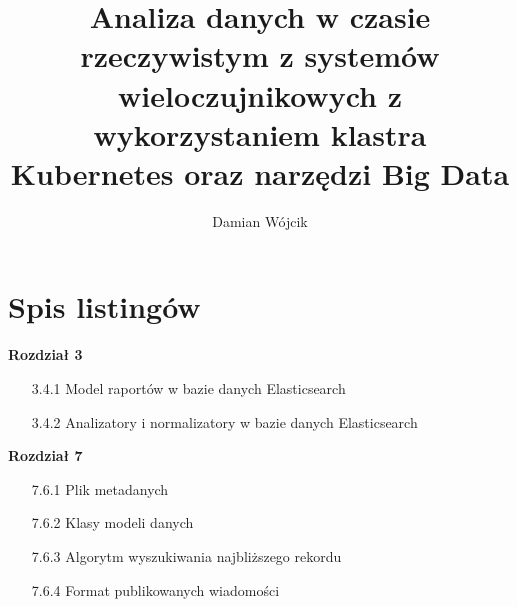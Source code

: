 \documentclass[12pt]{przejsciowka}
\title{Analiza danych w czasie rzeczywistym z systemów wieloczujnikowych z wykorzystaniem klastra Kubernetes oraz narzędzi Big Data}
\author{Damian Wójcik}
\newcommand{\inputcleanchapter}[1]{%
    \begingroup
    
    \endgroup
}
\begin{document}
    \maketitle
    \tableofcontents
    \clearpage

    \inputcleanchapter{abstract_pl}
    \clearpage

    \inputcleanchapter{abstract_en}
    \clearpage


    \inputcleanchapter{rozdzial1_wprowadzenie}
    \clearpage


    \inputcleanchapter{rozdzial2_przeglad_literatury}
    \clearpage


    \inputcleanchapter{rozdzial3_projekt_systemu}
    \clearpage

    \inputcleanchapter{rozdzial10_funkcje_biznesowe}
    \clearpage

    \inputcleanchapter{rozdzial4_implementacja_systemu}
    \clearpage
    
    \inputcleanchapter{rozdzial5_algorytmy_analizy}
    \clearpage
    
    \inputcleanchapter{rozdzial9_generator_danych}
    \clearpage

    \inputcleanchapter{rozdzial11_konfiguracja_kubernetes}
    \clearpage

    \inputcleanchapter{rozdzial12_autoryzacja}
    \clearpage

    \inputcleanchapter{rozdzial7_zastosowania}
    \clearpage
 
    \inputcleanchapter{rozdzial8_podsumowanie}
    \clearpage

    \listoffigures
    \clearpage

    \listoftables
    \clearpage

    \clearpage

    \begingroup
    \section*{Spis listingów}

    \vspace{10pt}
    \noindent\textbf{Rozdział 3}
    \begin{itemize}
        \setlength\itemsep{-0.5em}
        \item[3.4.1] Model raportów w bazie danych Elasticsearch
        \item[3.4.2] Analizatory i normalizatory w bazie danych Elasticsearch
    \end{itemize}

    \vspace{10pt}
    \noindent\textbf{Rozdział 7}
    \begin{itemize}
        \setlength\itemsep{-0.5em}
        \item[7.6.1] Plik metadanych
        \item[7.6.2] Klasy modeli danych
        \item[7.6.3] Algorytm wyszukiwania najbliższego rekordu
        \item[7.6.4] Format publikowanych wiadomości
    \end{itemize}
    \endgroup
    \clearpage

    
\end{document}
